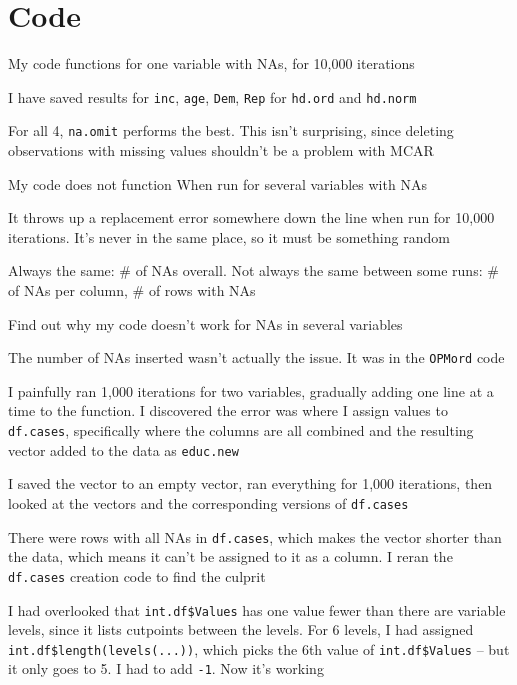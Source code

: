 \documentclass[12pt]{article}
\begin{document}
\section*{Code}
	\begin{coi}
		\item My code functions for one variable with NAs, for 10,000 iterations
			\begin{coi}
				\item I have saved results for \texttt{inc}, \texttt{age}, \texttt{Dem}, \texttt{Rep} for \texttt{hd.ord} and \texttt{hd.norm}
				\item For all 4, \texttt{na.omit} performs the best. This isn't surprising, since deleting observations with missing values shouldn't be a problem with MCAR
			\end{coi}
		\item My code does not function When run for several variables with NAs
			\begin{coi}
				\item It throws up a replacement error somewhere down the line when run for 10,000 iterations. It's never in the same place, so it must be something random
				\item Always the same: \# of NAs overall. Not always the same between some runs: \# of NAs per column, \# of rows with NAs
				\item Find out why my code doesn't work for NAs in several variables
					\begin{coi}
						\item The number of NAs inserted wasn't actually the issue. It was in the \texttt{OPMord} code
						\item I painfully ran 1,000 iterations for two variables, gradually adding one line at a time to the function. I discovered the error was where I assign values to \texttt{df.cases}, specifically where the columns are all combined and the resulting vector added to the data as \texttt{educ.new}
						\item I saved the vector to an empty vector, ran everything for 1,000 iterations, then looked at the vectors and the corresponding versions of \texttt{df.cases}
						\item There were rows with all NAs in \texttt{df.cases}, which makes the vector shorter than the data, which means it can't be assigned to it as a column. I reran the \texttt{df.cases} creation code to find the culprit
						\item I had overlooked that \texttt{int.df\$Values} has one value fewer than there are variable levels, since it lists cutpoints between the levels. For 6 levels, I had assigned \texttt{int.df\$length(levels(...))}, which picks the 6th value of \texttt{int.df\$Values} -- but it only goes to 5. I had to add \texttt{-1}. Now it's working

\end{coi}
\end{coi}
\end{coi}
\end{document}
